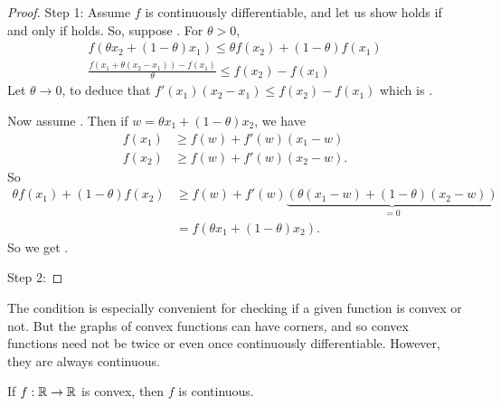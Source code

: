 \begin{proof}
Step 1:
Assume $f$ is continuously differentiable, and let us show  holds if and only if  holds.
So, suppose .
For $\theta > 0$, 
\begin{align}
f(\theta x_2 + (1-\theta) x_1) \le \theta f(x_2) + (1-\theta) f(x_1) \\
\frac{f(x_1 + \theta (x_2 - x_1)) - f(x_1)}{\theta} \le f(x_2) - f(x_1)
\end{align}
Let $\theta \to 0$, to deduce that $f'(x_1) (x_2 - x_1) \le f(x_2) - f(x_1)$ which is .

Now assume .
Then if $w = \theta x_1 + (1-\theta) x_2$, we have
\begin{align}
f(x_1) & \ge f(w) + f'(w) (x_1-w) \\
f(x_2) & \ge f(w) + f'(w) (x_2-w).
\end{align}
So
\begin{align}
\theta f(x_1) + (1-\theta) f(x_2) & \ge f(w) + f'(w) \underbrace{( \theta (x_1 - w) + (1-\theta) (x_2 - w) )}_{=0} \\
& = f(\theta x_1 + (1-\theta) x_2 ).
\end{align}
So we get .

Step 2:

\end{proof}

The condition  is especially convenient for checking if a given function is convex or not.
But the graphs of convex functions can have corners, and so convex functions need not be twice or even once continuously differentiable.
However, they are always continuous.

\begin{theorem}
If $f:\mathbb{R} \to \mathbb{R}$ is convex, then $f$ is continuous.
\end{theorem}

